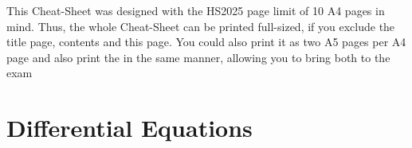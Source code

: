 \documentclass{article}
\begin{document}
This Cheat-Sheet was designed with the HS2025 page limit of 10 A4 pages in mind. 
Thus, the whole Cheat-Sheet can be printed full-sized, if you exclude the title page, contents and this page.
You could also print it as two A5 pages per A4 page and also print the 
\color{MidnightBlue}\color{black} 
\smallhspace in the same manner, allowing you to bring both to the exam



\newsection
\section{Differential Equations}




% 
\end{document}
